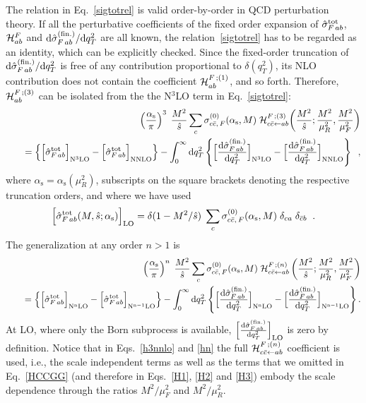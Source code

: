 \documentclass[12pt]{article}
\def\beeq{\begin{eqnarray}}
\def\eeeq{\end{eqnarray}}
\def\nn{\nonumber}
\DeclareRobustCommand{\as}{\ensuremath{\alpha_{\mathrm{s}}}}
\newcommand\f[2]{\frac{#1}{#2}}
\def\ito{\leftarrow}
\DeclareRobustCommand{\qt}{q_T}
\DeclareRobustCommand{\rd}{\ensuremath{\mathrm{d}}}
\begin{document}
The relation in Eq.~\eqref{sigtotrel} is valid order-by-order in QCD perturbation theory. If all the perturbative coefficients of the fixed order expansion of ${\hat \sigma}_{F \,ab}^{{\rm {tot}}}$, ${\cal H}_{ab}^F$ and  $\rd{\hat \sigma}_{F \,ab}^{(\rm fin.)}/\rd \qt^2$ are all known, the relation~\eqref{sigtotrel} has to be regarded as an identity, which can be explicitly checked. Since the fixed-order truncation of $ \rd{\hat \sigma}_{F \,ab}^{(\rm fin.)}/{\rd \qt^2}$ is free of any contribution proportional to $\delta(\qt^2)$, its NLO contribution  does not contain the coefficient ${\cal H}_{ab}^{F \,;(1)}$, and so forth. 
Therefore, ${\cal H}_{ab}^{F \,;(3)}$ can be isolated from the 
 the  N$^{3}$LO  term in Eq.~\eqref{sigtotrel}:
\beeq
\label{h3nnlo}
&&\left( \f{\as}{\pi} \right)^3\;\f{M^2}{\hat s} 
\sum_c \sigma_{c{\bar c}, \,F}^{(0)}(\as,M)
\; {\cal H}_{c{\bar c} \ito 
ab}^{F \,;(3)}\!\left(\f{M^2}{\hat s};
\f{M^2}{\mu_R^2},\f{M^2}{\mu_F^2}\right) \nn \\
&& \quad = \left\{
\Bigl[ {\hat \sigma}_{F \,ab}^{{\rm {tot}}} \Bigr]_{\rm N^{3}LO} 
- \Bigl[ {\hat \sigma}_{F \,ab}^{{\rm {tot}}} \Bigr]_{\rm NNLO} 
\right\}
- \int_0^{\infty} \rd\qt^2 
\left\{
\Bigl[ \f{\rd{\hat \sigma}_{F \,ab}^{(\rm fin.)}}{\rd \qt^2} 
\Bigr]_{\rm N^{3}LO} - 
\Bigl[ \f{\rd{\hat \sigma}_{F \,ab}^{(\rm fin.)}}{\rd \qt^2} 
\Bigr]_{\rm NNLO}
\right\}\;\;,
\eeeq
where $\as=\as(\mu_R^2)$, subscripts on the square brackets denoting the respective truncation orders, 
 and where we have used
\begin{equation}
\Bigl[ {\hat \sigma}_{F \,ab}^{{\rm {tot}}}(M,{\hat s};
\as) \Bigr]_{\rm LO} = \delta(1 - M^2/\hat s)
\;\sum_c \sigma_{c{\bar c}, \,F}^{(0)}(\as,M) \;\delta_{ca} 
\;\delta_{{\bar c}b} \;\;.
\end{equation}
The generalization at any order $n > 1$ is~\cite{Bozzi:2005wk}
\beeq
\label{hn}
&&\left( \f{\as}{\pi} \right)^n\;\f{M^2}{\hat s} 
\sum_c \sigma_{c{\bar c}, \,F}^{(0)}(\as,M)
\; {\cal H}_{c{\bar c} \ito 
ab}^{F \,;(n)}\left(\f{M^2}{\hat s};
\f{M^2}{\mu_R^2},\f{M^2}{\mu_F^2}\right) \\
&& \quad = \left\{
\Bigl[ {\hat \sigma}_{F \,ab}^{{\rm {tot}}} \Bigr]_{\rm N^nLO} 
- \Bigl[ {\hat \sigma}_{F \,ab}^{{\rm {tot}}} \Bigr]_{\rm N^{n-1}LO} 
\right\} 
- \int_0^{\infty} \rd\qt^2 
\left\{
\Bigl[ \f{\rd{\hat \sigma}_{F \,ab}^{(\rm fin.)}}{\rd \qt^2} 
\Bigr]_{\rm N^{n}LO} - 
\Bigl[ \f{\rd{\hat \sigma}_{F \,ab}^{(\rm fin.)}}{\rd \qt^2} 
\Bigr]_{\rm N^{n-1}LO}
\right\} . \nn
\eeeq
At LO, where only the Born subprocess is available, $\Bigl[ \f{\rd{\hat \sigma}_{F \,ab}^{(\rm fin.)}}{\rd \qt^2} \Bigr]_{\rm LO}$ is zero by definition. Notice that in Eqs.~\eqref{h3nnlo} and \eqref{hn} the full  ${\cal H}_{c{\bar c} \ito ab}^{F \,;(n)}$ coefficient is used, i.e., the scale independent terms as well as the terms that we omitted in Eq.~\eqref{HCCGG} (and therefore in Eqs.~\eqref{H1}, \eqref{H2} and \eqref{H3}) embody the scale dependence through the ratios $M^{2}/\mu^{2}_{F}$ and $M^{2}/\mu^{2}_{R}$.
\end{document}
